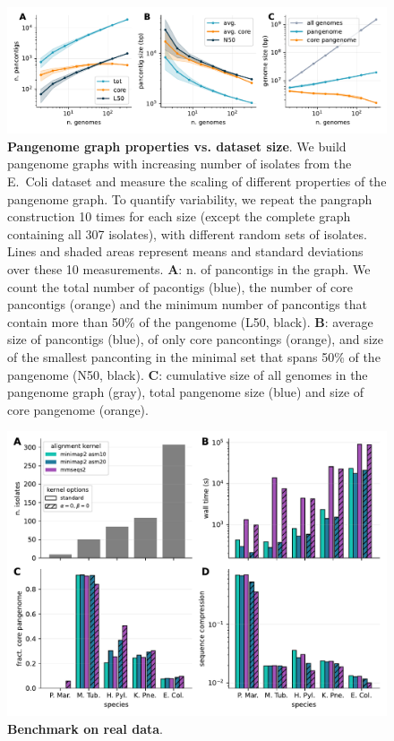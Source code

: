 \documentclass[aps,rmp,reprint,superscriptaddress,notitlepage,10pt]{revtex4-1}
\begin{document}
\begin{figure}[htb]
    \includegraphics[width=.9\textwidth]{figs/incr_size.pdf}
    \caption{{\bf Pangenome graph properties vs. dataset size}. We build pangenome graphs with increasing number of isolates from the E.~Coli dataset and measure the scaling of different properties of the pangenome graph. To quantify variability, we repeat the pangraph construction 10 times for each size (except the complete graph containing all 307 isolates), with different random sets of isolates. Lines and shaded areas represent means and standard deviations over these 10 measurements.
        \textbf{A}: n. of pancontigs in the graph. We count the total number of pacontigs (blue), the number of core pancontigs (orange) and the minimum number of pancontigs that contain more than 50\% of the pangenome (L50, black).
        \textbf{B}: average size of pancontigs (blue), of only core pancontings (orange), and size of the smallest panconting in the minimal set that spans 50\% of the pangenome (N50, black).
        \textbf{C}: cumulative size of all genomes in the pangenome graph (gray), total pangenome size (blue) and size of core pangenome (orange).
    }
    \label{fig:panx-size}
\end{figure}

\begin{figure}[htb]
    \includegraphics[width=.7\textwidth]{figs/panx_benchmark.pdf}
    \caption{{\bf Benchmark on real data}.}
    \label{fig:panx-benchmark}
\end{figure}
\end{document}
